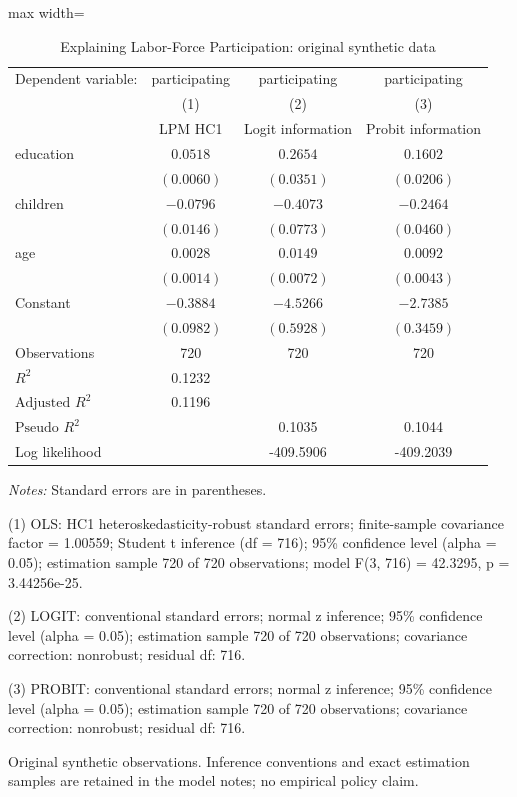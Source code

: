 \begin{table}[htbp]
\centering
\caption{Explaining Labor-Force Participation: original synthetic data}
\label{tab:12-binary-outcomes}
\begingroup
\small
\setlength{\tabcolsep}{6pt}
\renewcommand{\arraystretch}{1.12}
\begin{adjustbox}{max width=\linewidth}
\begin{tabular}{@{}lccc@{}}
\toprule
Dependent variable: & participating & participating & participating \\
 & (1) & (2) & (3) \\
 & LPM HC1 & Logit information & Probit information \\
\midrule
education & $0.0518$ & $0.2654$ & $0.1602$ \\
 & $(0.0060)$ & $(0.0351)$ & $(0.0206)$ \\[0.35em]
children & $-0.0796$ & $-0.4073$ & $-0.2464$ \\
 & $(0.0146)$ & $(0.0773)$ & $(0.0460)$ \\[0.35em]
age & $0.0028$ & $0.0149$ & $0.0092$ \\
 & $(0.0014)$ & $(0.0072)$ & $(0.0043)$ \\[0.35em]
Constant & $-0.3884$ & $-4.5266$ & $-2.7385$ \\
 & $(0.0982)$ & $(0.5928)$ & $(0.3459)$ \\[0.35em]
\midrule
Observations & 720 & 720 & 720 \\
$R^{2}$ & 0.1232 &  &  \\
$\text{Adjusted }R^{2}$ & 0.1196 &  &  \\
$\text{Pseudo }R^{2}$ &  & 0.1035 & 0.1044 \\
Log likelihood &  & -409.5906 & -409.2039 \\
\bottomrule
\end{tabular}
\end{adjustbox}
\par\smallskip
\begin{minipage}{\linewidth}
\footnotesize
\raggedright
\textit{Notes:} Standard errors are in parentheses.\par
(1) OLS: HC1 heteroskedasticity-robust standard errors; finite-sample covariance factor = 1.00559; Student t inference (df = 716); 95\% confidence level (alpha = 0.05); estimation sample 720 of 720 observations; model F(3, 716) = 42.3295, p = 3.44256e-25.\par
(2) LOGIT: conventional standard errors; normal z inference; 95\% confidence level (alpha = 0.05); estimation sample 720 of 720 observations; covariance correction: nonrobust; residual df: 716.\par
(3) PROBIT: conventional standard errors; normal z inference; 95\% confidence level (alpha = 0.05); estimation sample 720 of 720 observations; covariance correction: nonrobust; residual df: 716.\par
Original synthetic observations. Inference conventions and exact estimation samples are retained in the model notes; no empirical policy claim.\par
\end{minipage}
\endgroup
\end{table}
